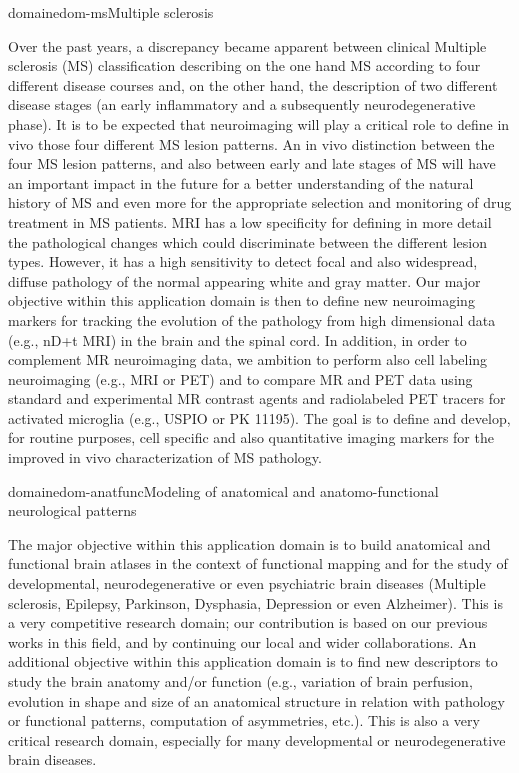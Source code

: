 \documentclass{ra2018}
\begin{document}
\begin{module}{domaine}{dom-ms}{Multiple sclerosis}

Over the past years, a discrepancy became apparent between clinical Multiple sclerosis (MS) classification describing on the one hand MS according to four different disease courses and, on the other hand, the description of two different disease stages (an early inflammatory and a subsequently neurodegenerative phase). It is to be expected that neuroimaging will play a critical role to define in vivo those four different MS lesion patterns. An in vivo distinction between the four MS lesion patterns, and also between early and late stages of MS will have an important impact in the future for a better understanding of the natural history of MS and even more for the appropriate selection and monitoring of drug treatment in MS patients. MRI has a low specificity for defining in more detail the pathological changes which could discriminate between the different lesion types. However, it has a high sensitivity to detect focal and also widespread, diffuse pathology of the normal appearing white and gray matter. Our major objective within this application domain is then to define new neuroimaging markers for tracking the evolution of the pathology from high dimensional data (e.g., nD+t MRI) in the brain and the spinal cord. In addition, in order to complement MR neuroimaging data, we ambition to perform also cell labeling neuroimaging (e.g., MRI or PET) and to compare MR and PET data using standard and experimental MR contrast agents and radiolabeled PET tracers for activated microglia (e.g., USPIO or PK 11195). The goal is to define and develop, for routine purposes, cell specific and also quantitative imaging markers for the improved in vivo characterization of MS pathology. 

\end{module}

\begin{module}{domaine}{dom-anatfunc}{Modeling of anatomical and anatomo-functional neurological patterns}

The major objective within this application domain is to build anatomical and functional brain atlases in the context of functional mapping and for the study of developmental, neurodegenerative or even psychiatric brain diseases (Multiple sclerosis, Epilepsy, Parkinson, Dysphasia, Depression or even Alzheimer). This is a very competitive research domain; our contribution is based on our previous works in this field, and by continuing our local and wider collaborations. An additional objective within this application domain is to find new descriptors to study the brain anatomy and/or function (e.g., variation of brain perfusion, evolution in shape and size of an anatomical structure in relation with pathology or functional patterns, computation of asymmetries, etc.). This is also a very critical research domain, especially for many developmental or neurodegenerative brain diseases. 

\end{module}
\end{document}
